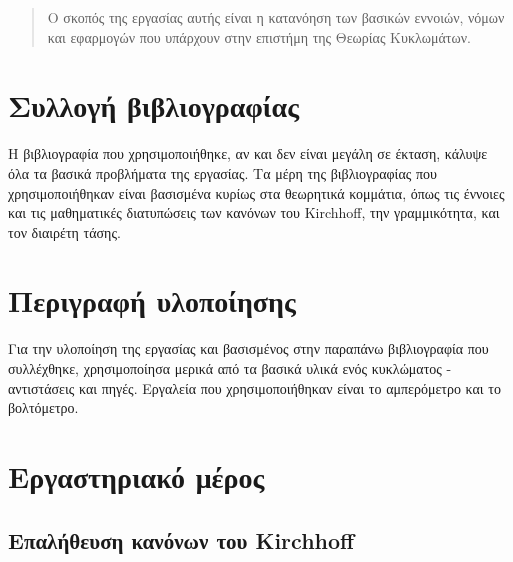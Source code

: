 \documentclass{article}
\begin{document}
\begin{titlepage}
\maketitle
\end{titlepage}

\renewcommand{\contentsname}{Περιεχόμενα}
\tableofcontents

\renewcommand{\abstractname}{Εισαγωγή}
\begin{abstract}
    Ο σκοπός της εργασίας αυτής είναι η κατανόηση των βασικών εννοιών, νόμων και
    εφαρμογών που υπάρχουν στην επιστήμη της Θεωρίας Κυκλωμάτων.
\end{abstract}
\pagebreak

\section{Συλλογή βιβλιογραφίας}
Η βιβλιογραφία που χρησιμοποιήθηκε, αν και δεν είναι μεγάλη σε έκταση, κάλυψε όλα
τα βασικά προβλήματα της εργασίας. Τα μέρη της βιβλιογραφίας που χρησιμοποιήθηκαν είναι
βασισμένα κυρίως στα θεωρητικά κομμάτια, όπως τις έννοιες και τις μαθηματικές
διατυπώσεις των κανόνων του Kirchhoff, την γραμμικότητα, και τον διαιρέτη τάσης.

\section{Περιγραφή υλοποίησης}
Για την υλοποίηση της εργασίας και βασισμένος στην παραπάνω βιβλιογραφία που συλλέχθηκε,
χρησιμοποίησα μερικά από τα βασικά υλικά ενός κυκλώματος - αντιστάσεις και πηγές.
Εργαλεία που χρησιμοποιήθηκαν είναι το αμπερόμετρο και το βολτόμετρο.

\section{Εργαστηριακό μέρος}
\subsection{Επαλήθευση κανόνων του Kirchhoff}
\end{document}
